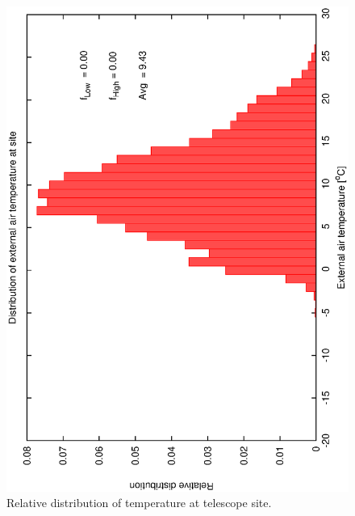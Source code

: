 \clearpage 
\begin{figure}[htbp]
\begin{center}
    \includegraphics[scale=0.4, angle=-90]{figures/ecs/temp_1525.dat.eps}
\caption[Relative distribution of temperature at telescope site.]
{Relative distribution of temperature at telescope site.}
\end{center}   
 \label{fig:met_temp_dist}
\end{figure}

